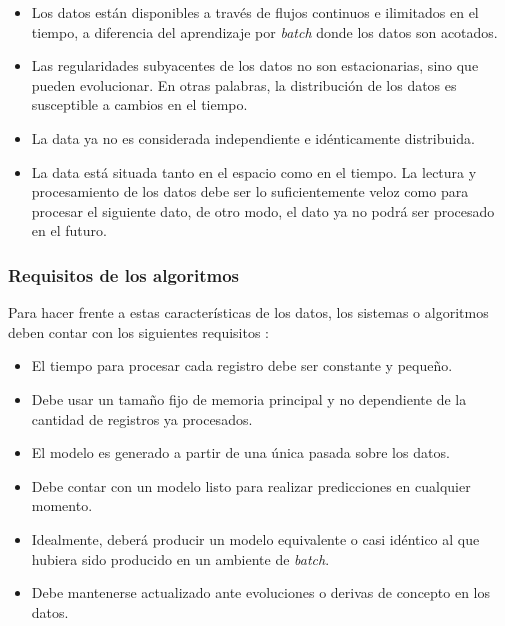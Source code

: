 \begin{itemize}

	\item Los datos están disponibles a través de flujos continuos e ilimitados
	      en el tiempo, a diferencia del aprendizaje por \textit{batch} donde los
	      datos son acotados.

	\item Las regularidades subyacentes de los datos no son estacionarias, sino
	      que pueden evolucionar. En otras palabras, la distribución de los datos es
	      susceptible a cambios en el tiempo.

	\item La data ya no es considerada independiente e idénticamente distribuida.

	\item La data está situada tanto en el espacio como en el tiempo. La lectura
	      y procesamiento de los datos debe ser lo suficientemente veloz como para
	      procesar el siguiente dato, de otro modo, el dato ya no podrá ser procesado
	      en el futuro.

\end{itemize}

\subsubsection{Requisitos de los algoritmos}
\label{stream_requisitos}

Para hacer frente a estas características de los datos, los sistemas o
algoritmos deben contar con los siguientes requisitos \cite{hulten_mining_2001}:

\begin{itemize}

	\item El tiempo para procesar cada registro debe ser constante y pequeño.

	\item Debe usar un tamaño fijo de memoria principal y no dependiente de la
	      cantidad de registros ya procesados.

	\item El modelo es generado a partir de una única pasada sobre los datos.

	\item Debe contar con un modelo listo para realizar predicciones en cualquier
	      momento.

	\item Idealmente, deberá producir un modelo equivalente o casi idéntico al que
	      hubiera sido producido en un ambiente de \textit{batch}.

	\item Debe mantenerse actualizado ante evoluciones o derivas de concepto en
	      los datos.

\end{itemize}

